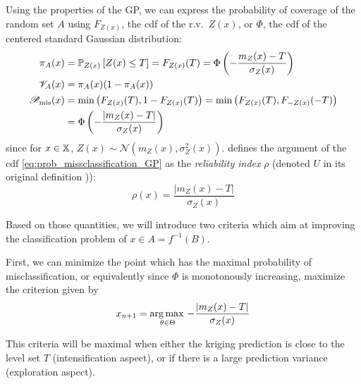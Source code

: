 \documentclass[../../Main_ManuscritThese.tex]{subfiles}
\begin{document}
Using the properties of the GP, we can express the probability of
coverage of the random set $A$ using $F_{Z(x)}$, the cdf of the r.v.\
$Z(x)$, or $\Phi$, the cdf of the centered standard Gaussian
distribution:
\begin{align}
  \pi_A(x) &= \mathbb{P}_{Z(x)}\left[Z(x) \leq T\right] = F_{Z(x)}(T)=\Phi\left(-\frac{m_Z(x) - T}{\sigma_Z(x)}\right) \\
  \mathscr{V}_A(x) &= \pi_A(x)(1 - \pi_A(x)) \\
  \mathscr{P}_{\mathrm{mis}}(x) &= \min\left(F_{Z(x)}(T), 1-F_{Z(x)}(T)\right)=\min\left(F_{Z(x)}(T),F_{-Z(x)}(-T)\right) \\
           &= \Phi\left(- \frac{\lvert m_Z(x) - T \rvert}{\sigma_Z(x)} \right) \label{eq:prob_missclassification_GP}
\end{align}
since for $x\in\mathbb{X}$,
$Z(x)\sim\mathcal{N}\left(m_Z(x), \sigma^2_Z(x)\right)$.
\cite{echard_ak-mcs_2011} defines the argument of the cdf
\cref{eq:prob_missclassification_GP} as the \emph{reliability index}
$\rho$ (denoted $U$ in its original definition
\cite{echard_ak-mcs_2011})):
\begin{equation}
  \label{eq:reliability_rho}
  \rho(x) = \frac{\lvert m_Z(x) - T \rvert}{\sigma_Z(x)}
\end{equation}

Based on those quantities, we will introduce two criteria which aim at
improving the classification problem of $x\in A=f^{-1}(B)$.

First, we can minimize the point which has the maximal probability of
misclassification, or equivalently since $\Phi$ is monotonously
increasing, maximize the criterion given by
\begin{equation} x_{n+1} =\operatorname*{arg\,max \,}_{\theta\in\Theta} -\frac{\lvert m_Z(x)- T \rvert}{\sigma_Z(x)}
\end{equation}

This criteria will be maximal when either the kriging prediction is
close to the level set $T$ (intensification aspect), or if there is a
large prediction variance (exploration aspect).
\end{document}
